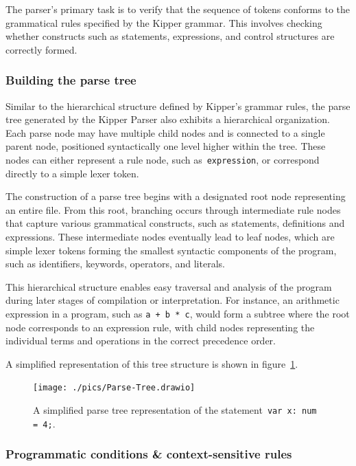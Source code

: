 The parser's primary task is to verify that the sequence of tokens conforms to the grammatical rules specified by the Kipper grammar. This involves checking whether constructs such as statements, expressions, and control structures are correctly formed.

\subsubsection{Building the parse tree}

Similar to the hierarchical structure defined by Kipper's grammar rules, the parse tree generated by the Kipper Parser also exhibits a hierarchical organization. Each parse node may have multiple child nodes and is connected to a single parent node, positioned syntactically one level higher within the tree. These nodes can either represent a rule node, such as~\lstinline|expression|, or correspond directly to a simple lexer token.

The construction of a parse tree begins with a designated root node representing an entire file. From this root, branching occurs through intermediate rule nodes that capture various grammatical constructs, such as statements, definitions and expressions. These intermediate nodes eventually lead to leaf nodes, which are simple lexer tokens forming the smallest syntactic components of the program, such as identifiers, keywords, operators, and literals.

This hierarchical structure enables easy traversal and analysis of the program during later stages of compilation or interpretation. For instance, an arithmetic expression in a program, such as \lstinline|a + b * c|, would form a subtree where the root node corresponds to an expression rule, with child nodes representing the individual terms and operations in the correct precedence order.

A simplified representation of this tree structure is shown in figure~\ref{fig:implementation:parse-tree}.

\begin{figure}[h!]
	\centering
	\texttt{[image: ./pics/Parse-Tree.drawio]}
	\caption{A simplified parse tree representation of the statement~\lstinline|var x: num = 4;|.}
	\label{fig:implementation:parse-tree}
\end{figure}

\subsubsection{Programmatic conditions \& context-sensitive rules}

